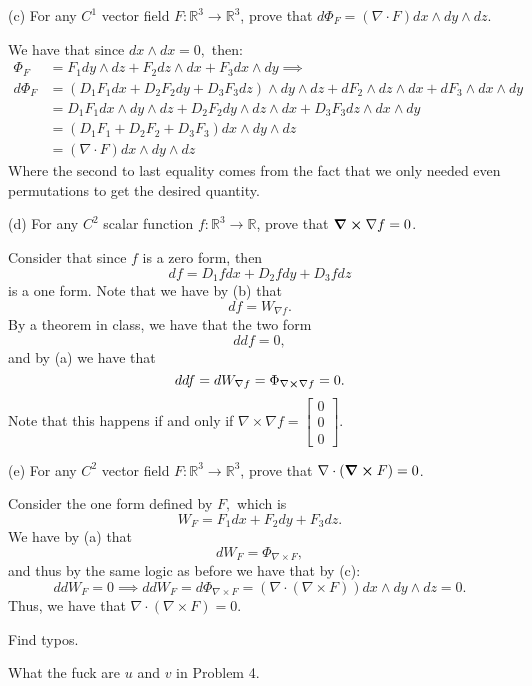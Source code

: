 \documentclass[11pt]{article}
\newcommand{\bbR}{\mathbb{R}}
\begin{document}
\begin{problem}
\begin{itemize}
\begin{problem}
\item[(c)] For any $C^1$ vector field $F : \bbR^3 \to \bbR^3$, prove that $d\Phi_F = (\nabla \cdot F) dx \wedge dy \wedge dz$.
\end{problem}
\begin{solution}
    We have that since $dx \wedge dx = 0,$ then:
    \begin{align*}
    \Phi_F &= F_1dy \wedge dz + F_2 dz \wedge dx + F_3dx\wedge dy \implies\\
    d\Phi_F &= (D_1F_1dx + D_2F_2dy + D_3F_3dz)\wedge dy\wedge dz + dF_2 \wedge dz \wedge dx + dF_3\wedge dx\wedge dy\\
    &= D_1F_1dx \wedge dy \wedge dz  + D_2F_2 dy \wedge dz \wedge dx + D_3F_3dz \wedge dx\wedge dy\\
    &= (D_1F_1 + D_2F_2 + D_3F_3)dx \wedge dy \wedge dz\\
    &= (\nabla \cdot F) dx \wedge dy \wedge dz
    \end{align*}
    Where the second to last equality comes from the fact that we only needed even permutations to get the desired quantity.
\end{solution}

\begin{problem}
    \item[(d)] For any $C^2$ scalar function $f : \bbR^3 \to \bbR$, prove that $\curl
\nabla f = 0$.
\end{problem}
\begin{solution}
    Consider that since $f$ is a zero form, then 
    \[df = D_1fdx + D_2fdy + D_3f dz\] is a one form. Note that we have by (b) that 
    \[df = W_{\nabla f}.\] By a theorem in class, we have that the two form
    \[ddf = 0,\] and by (a) we have that 
    \[ddf = dW_{\nabla f} = \Phi_{\nabla \cross \nabla f} = 0.\] Note that this happens if and only if $\nabla \times \nabla f = \begin{bmatrix}
        0\\0\\0
    \end{bmatrix}.$
\end{solution}
\begin{problem}
    \item[(e)] For any $C^2$ vector field $F : \bbR^3 \to \bbR^3$, prove that $\nabla \cdot (\curl F) = 0$.
\end{problem}
\begin{solution}
    Consider the one form defined by $F,$ which is
    \[W_F = F_1dx + F_2dy + F_3dz.\] We have by (a) that 
    \[dW_F = \Phi_{\nabla \times F},\] and thus by the same logic as before we have that by (c):
    \[ddW_F = 0\implies ddW_F = d\Phi_{\nabla \times F} = (\nabla \cdot ({\nabla \times F}))dx\wedge dy\wedge dz = 0.\]
    Thus, we have that $\nabla \cdot ({\nabla \times F}) = 0.$
\end{solution}
\end{itemize}
\end{problem}
\newpage
\begin{problem}
    Find typos.
\end{problem}
\begin{solution}
    What the fuck are $u$ and $v$ in Problem 4.
\end{solution}
\end{document}
